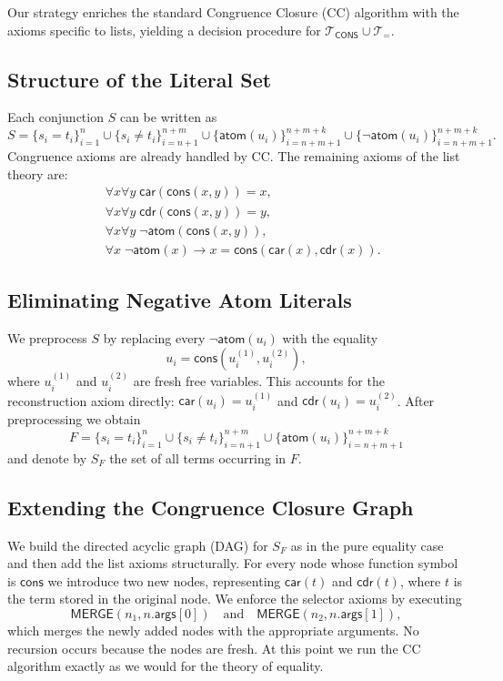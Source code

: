 \documentclass[11pt,a4paper]{article}
\theoremstyle{definition}
\theoremstyle{plain}
\theoremstyle{remark}
\begin{document}
Our strategy enriches the standard Congruence Closure (CC) algorithm with the axioms specific to lists, yielding a decision procedure for $\mathcal{T}_{\textsf{CONS}} \cup \mathcal{T}_{=}$. 

\subsection{Structure of the Literal Set}

Each conjunction $S$ can be written as
\[
S = \{s_i = t_i\}_{i=1}^{n} \cup \{s_i \neq t_i\}_{i=n+1}^{n+m} \cup \{\textsf{atom}(u_i)\}_{i=n+m+1}^{n+m+k} \cup \{\neg \textsf{atom}(u_i)\}_{i=n+m+1}^{n+m+k}.
\]
Congruence axioms are already handled by CC. The remaining axioms of the list theory are:
\begin{align*}
&\forall x \forall y \; \textsf{car}(\textsf{cons}(x, y)) = x, \\\
&\forall x \forall y \; \textsf{cdr}(\textsf{cons}(x, y)) = y, \\\
&\forall x \forall y \; \neg \textsf{atom}(\textsf{cons}(x, y)), \\\
&\forall x \; \neg \textsf{atom}(x) \rightarrow x = \textsf{cons}(\textsf{car}(x), \textsf{cdr}(x)).
\end{align*}

\subsection{Eliminating Negative Atom Literals}

We preprocess $S$ by replacing every $\neg \textsf{atom}(u_i)$ with the equality
\[
u_i = \textsf{cons}(u_i^{(1)}, u_i^{(2)}),\]
where $u_i^{(1)}$ and $u_i^{(2)}$ are fresh free variables. This accounts for the reconstruction axiom directly: $\textsf{car}(u_i) = u_i^{(1)}$ and $\textsf{cdr}(u_i) = u_i^{(2)}$. After preprocessing we obtain
\[
F = \{s_i = t_i\}_{i=1}^{n} \cup \{s_i \neq t_i\}_{i=n+1}^{n+m} \cup \{\textsf{atom}(u_i)\}_{i=n+m+1}^{n+m+k}
\]
and denote by $S_F$ the set of all terms occurring in $F$.

\subsection{Extending the Congruence Closure Graph}

We build the directed acyclic graph (DAG) for $S_F$ as in the pure equality case and then add the list axioms structurally. For every node whose function symbol is $\textsf{cons}$ we introduce two new nodes, representing $\textsf{car}(t)$ and $\textsf{cdr}(t)$, where $t$ is the term stored in the original node. We enforce the selector axioms by executing
\[
\textsf{MERGE}(n_1, n.\textsf{args}[0]) \quad \text{and} \quad \textsf{MERGE}(n_2, n.\textsf{args}[1]),
\]
which merges the newly added nodes with the appropriate arguments. No recursion occurs because the nodes are fresh. At this point we run the CC algorithm exactly as we would for the theory of equality.
\end{document}
